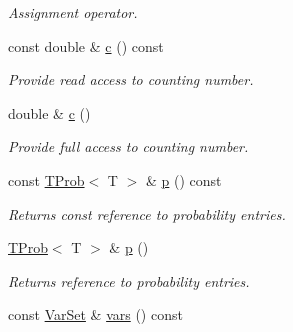 \begin{CompactItemize}
\begin{CompactList}\small\item\em Assignment operator. \item\end{CompactList}\item 
\hypertarget{classdai_1_1FRegion_94c63ec48848b132eeb024515978f654}{
const double \& \hyperlink{classdai_1_1FRegion_94c63ec48848b132eeb024515978f654}{c} () const }
\label{classdai_1_1FRegion_94c63ec48848b132eeb024515978f654}

\begin{CompactList}\small\item\em Provide read access to counting number. \item\end{CompactList}\item 
\hypertarget{classdai_1_1FRegion_f6e5b1ea80c052f98056d29d47a76145}{
double \& \hyperlink{classdai_1_1FRegion_f6e5b1ea80c052f98056d29d47a76145}{c} ()}
\label{classdai_1_1FRegion_f6e5b1ea80c052f98056d29d47a76145}

\begin{CompactList}\small\item\em Provide full access to counting number. \item\end{CompactList}\item 
\hypertarget{classdai_1_1TFactor_c742180c0abe1be45fbf3208f7014a1b}{
const \hyperlink{classdai_1_1TProb}{TProb}$<$ T $>$ \& \hyperlink{classdai_1_1TFactor_c742180c0abe1be45fbf3208f7014a1b}{p} () const }
\label{classdai_1_1TFactor_c742180c0abe1be45fbf3208f7014a1b}

\begin{CompactList}\small\item\em Returns const reference to probability entries. \item\end{CompactList}\item 
\hypertarget{classdai_1_1TFactor_ba85b145db1c3b72978e11fb385659e1}{
\hyperlink{classdai_1_1TProb}{TProb}$<$ T $>$ \& \hyperlink{classdai_1_1TFactor_ba85b145db1c3b72978e11fb385659e1}{p} ()}
\label{classdai_1_1TFactor_ba85b145db1c3b72978e11fb385659e1}

\begin{CompactList}\small\item\em Returns reference to probability entries. \item\end{CompactList}\item 
\hypertarget{classdai_1_1TFactor_54c575d53b8c8a6a03c26c8cdc600ce4}{
const \hyperlink{classdai_1_1VarSet}{VarSet} \& \hyperlink{classdai_1_1TFactor_54c575d53b8c8a6a03c26c8cdc600ce4}{vars} () const }
\label{classdai_1_1TFactor_54c575d53b8c8a6a03c26c8cdc600ce4}


\end{CompactItemize}
